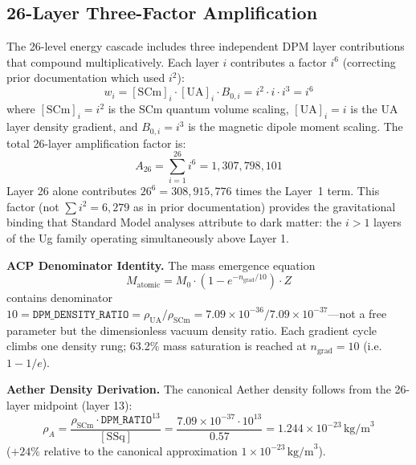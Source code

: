 \documentclass[12pt,a4paper]{article}
\begin{document}
\subsection{26-Layer Three-Factor Amplification}
\label{sec:26layer_amplification}

The 26-level energy cascade includes three independent DPM layer contributions that compound multiplicatively. Each layer $i$ contributes a factor $i^6$ (correcting prior documentation which used $i^2$):
\begin{equation}
w_i = [\text{SCm}]_i \cdot [\text{UA}]_i \cdot B_{0,i} = i^2 \cdot i \cdot i^3 = i^6
\label{eq:26layer_weight}
\end{equation}
where $[\text{SCm}]_i = i^2$ is the SCm quantum volume scaling, $[\text{UA}]_i = i$ is the UA layer density gradient, and $B_{0,i} = i^3$ is the magnetic dipole moment scaling. The total 26-layer amplification factor is:
\begin{equation}
A_{26} = \sum_{i=1}^{26} i^6 = 1{,}307{,}798{,}101
\label{eq:A26}
\end{equation}
Layer 26 alone contributes $26^6 = 308{,}915{,}776$ times the Layer~1 term. This factor (not $\sum i^2 = 6{,}279$ as in prior documentation) provides the gravitational binding that Standard Model analyses attribute to dark matter: the $i > 1$ layers of the Ug family operating simultaneously above Layer 1.

\textbf{ACP Denominator Identity.} The mass emergence equation
\begin{equation}
M_{\mathrm{atomic}} = M_0 \cdot \left(1 - e^{-n_{\mathrm{grad}}/10}\right) \cdot Z
\end{equation}
contains denominator $10 = \mathtt{DPM\_DENSITY\_RATIO} = \rho_{\mathrm{UA}}/\rho_{\mathrm{SCm}} = 7.09 \times 10^{-36} / 7.09 \times 10^{-37}$---not a free parameter but the dimensionless vacuum density ratio. Each gradient cycle climbs one density rung; 63.2\% mass saturation is reached at $n_{\mathrm{grad}} = 10$ (i.e.\ $1 - 1/e$).

\textbf{Aether Density Derivation.} The canonical Aether density follows from the 26-layer midpoint (layer 13):
\begin{equation}
\rho_A = \frac{\rho_{\mathrm{SCm}} \cdot \mathtt{DPM\_RATIO}^{13}}{[\text{SSq}]} = \frac{7.09 \times 10^{-37} \cdot 10^{13}}{0.57} = 1.244 \times 10^{-23}\,\text{kg/m}^3
\label{eq:rhoA_derived}
\end{equation}
($+24\%$ relative to the canonical approximation $1 \times 10^{-23}\,\text{kg/m}^3$).
\end{document}
